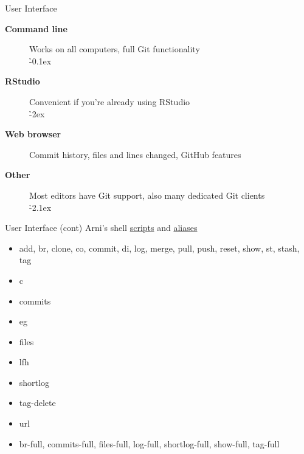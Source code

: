 \documentclass[aspectratio=169]{beamer}
\begin{document}
\begin{frame}{User Interface}\small
  \begin{description}
    \item[\bf Command line] Works on all computers, full Git
    functionality\\[0.8ex]
    \h{-0.1ex}\\[5ex]
    \item[\bf RStudio] Convenient if you're already using RStudio\\[0.8ex]
    \h{-2ex}\\[5ex]
    \item[\bf Web browser] Commit history, files and lines changed, GitHub
    features\\[5ex]
    \item[\bf Other] Most editors have Git support, also many dedicated Git
    clients\\[0.8ex]
    \h{-2.1ex}
  \end{description}
\end{frame}


\begin{frame}{User Interface (cont)}\small
  Arni's shell {\blue\href{https://github.com/arni-magnusson/bin}{scripts}} and
  {\blue
    \href{https://github.com/arni-magnusson/dot/blob/master/.bashrc}{aliases}}
  \begin{itemize}\fns
    \item[] add, br, clone, co, commit, di, log, merge, pull, push, reset, show,
    st, stash, tag 
    \item[] c 
    \item[] commits 
    \item[] eg 
    \item[] files 
    \item[] lfh 
    \item[] shortlog 
    \item[] tag-delete 
    \item[] url 
    \item[] br-full, commits-full, files-full, log-full, shortlog-full,
    show-full, tag-full
  \end{itemize}
\end{frame}
\end{document}
